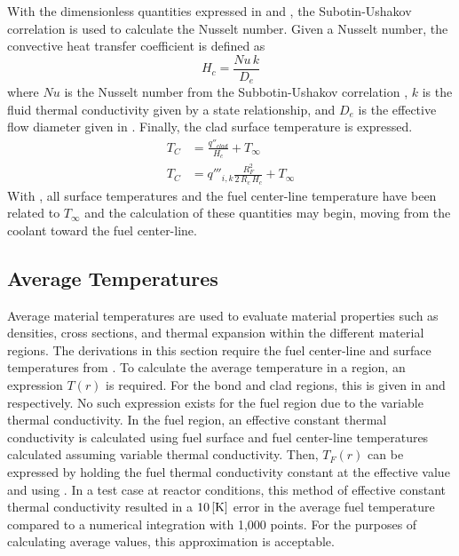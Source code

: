       With the dimensionless quantities expressed in  and
      , the Subotin-Ushakov correlation is used to calculate the 
      Nusselt number. Given a Nusselt number, the convective heat transfer 
      coefficient is defined as
      \begin{equation}
        \label{eq:hc}
        H_c = \frac{N\!u \, k}{D_e}
      \end{equation}
      where $Nu$ is the Nusselt number from the Subbotin-Ushakov correlation
      , $k$ is the fluid thermal conductivity given by 
      a state relationship, and $D_e$ is the effective flow diameter given in
      . Finally, the clad surface temperature is 
      expressed.
      \begin{align}
        T_C &= \frac{q''_{clad}}{H_c} + T_{\infty} \\
        \label{eq:tc}
        T_C &= q'''_{i,k} \frac{R_F^2}{2\,R_c\,H_c} + T_{\infty}
      \end{align}
      With , all surface temperatures and the fuel center-line
      temperature have been related to $T_{\infty}$ and the calculation of these
      quantities may begin, moving from the coolant toward the fuel center-line.

  \subsection{Average Temperatures}
    \label{sec:average_temps}
    Average material temperatures are used to evaluate material properties such
    as densities, cross sections, and thermal expansion within the different 
    material regions. The
    derivations in this section require the fuel center-line and surface
    temperatures from . To calculate the average
    temperature in a region, an expression $T(r)$ is required. For the bond and
    clad regions, this is given in  and  respectively.
    No such expression exists for the fuel region due to the variable thermal
    conductivity. In the fuel region, an effective constant thermal conductivity
    is calculated using fuel surface and fuel center-line temperatures
    calculated assuming variable thermal conductivity. Then, $T_F(r)$ can be 
    expressed by holding the fuel thermal conductivity constant at the effective
    value and using . In a test case at reactor 
    conditions, this method of effective 
    constant thermal conductivity resulted in a $10 \left[\text{{K}}\right]$ error in the 
    average fuel temperature compared to a numerical integration with 1,000
    points. For the purposes of calculating average values, this approximation
    is acceptable.

